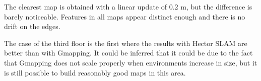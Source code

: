 The clearest map is obtained with a linear update of 0.2 m, but the difference is barely noticeable. Features in all maps appear distinct enough and there is no drift on the edges.

The case of the third floor is the first where the results with Hector SLAM are better than with Gmapping. It could be inferred that it could be due to the fact that Gmapping does not scale properly when environments increase in size, but it is still possible to build reasonably good maps in this area.

